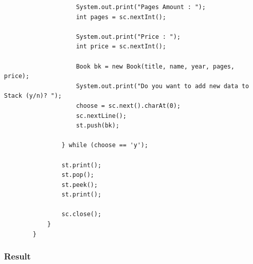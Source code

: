 \documentclass[12pt,titlepage]{article}
\begin{document}
\begin{enumerate}
\begin{verbatim}
                    System.out.print("Pages Amount : ");
                    int pages = sc.nextInt();

                    System.out.print("Price : ");
                    int price = sc.nextInt();

                    Book bk = new Book(title, name, year, pages, price);
                    System.out.print("Do you want to add new data to Stack (y/n)? ");
                    choose = sc.next().charAt(0);
                    sc.nextLine();
                    st.push(bk);

                } while (choose == 'y');

                st.print();
                st.pop();
                st.peek();
                st.print();
                
                sc.close();
            }
        }
    \end{verbatim}
\end{enumerate}

\subsubsection{Result}
\end{document}
